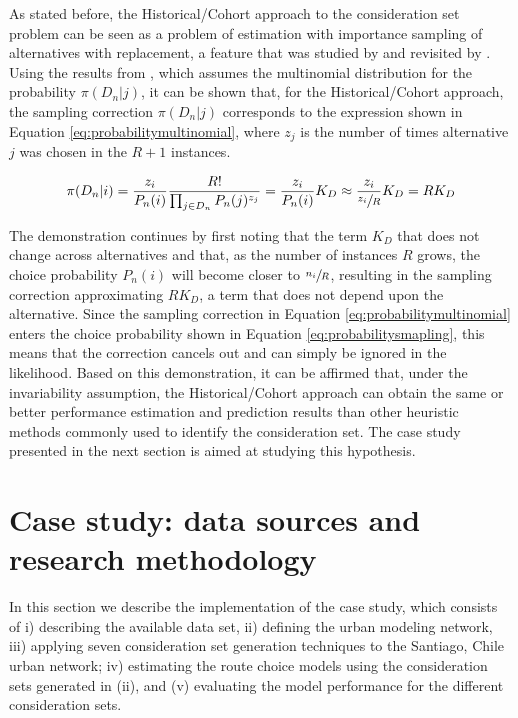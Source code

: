 \documentclass[12pt,a4paper]{article}
\begin{document}
As stated before, the Historical/Cohort approach to the consideration set problem can be seen as a problem of estimation with importance sampling of alternatives with replacement, a feature that was studied by \cite{ben1985discrete} and revisited by \cite{ben1989lecture}. Using the results from \cite{ben1989lecture}, which assumes the multinomial distribution for the probability $\pi(D_{n} |j)$, it can be shown that, for the Historical/Cohort approach, the sampling correction $\pi(D_{n} |j)$ corresponds to the expression shown in Equation \ref{eq:probabilitymultinomial}, where $z_{j}$ is the number of times alternative $j$ was chosen in the $R+1$  instances.

\begin{equation} \label{eq:probabilitymultinomial}
\pi(D_{n}|i) = \frac{z_{i}}{P_{n}(i)} \frac{R!}{\prod_{j \in D_{n}} P_{n}(j)^{z_{j}}}  = \frac{z_{i}}{P_{n}(i)} K_{D} \approx \frac{z_{i}}{\sfrac{z_{i}}{R}} K_{D} = RK_{D}
\end{equation}

The demonstration continues by first noting that the term $K_{D}$ that does not change across alternatives and that, as the number of instances $R$ grows, the choice probability $P_{n}(i)$ will become closer to $\sfrac{n_{i}}{R}$, resulting in the sampling correction approximating $RK_{D}$, a term that does not depend upon the alternative. Since the sampling correction in Equation \ref{eq:probabilitymultinomial} enters the choice probability shown in Equation \ref{eq:probabilitysmapling}, this means that the correction cancels out and can simply be ignored in the likelihood. Based on this demonstration, it can be affirmed that, under the invariability assumption, the Historical/Cohort approach can obtain the same or better performance estimation and prediction results than other heuristic methods commonly used to identify the consideration set. The case study presented in the next section is aimed at studying this hypothesis.

\section{Case study: data sources and research methodology}

In this section we describe the implementation of the case study, which consists of i) describing the available data set, ii) defining the urban modeling network, iii) applying seven consideration set generation techniques to the Santiago, Chile urban network; iv) estimating the route choice models using the consideration sets generated in (ii), and (v) evaluating the model performance for the different consideration sets.
\end{document}
